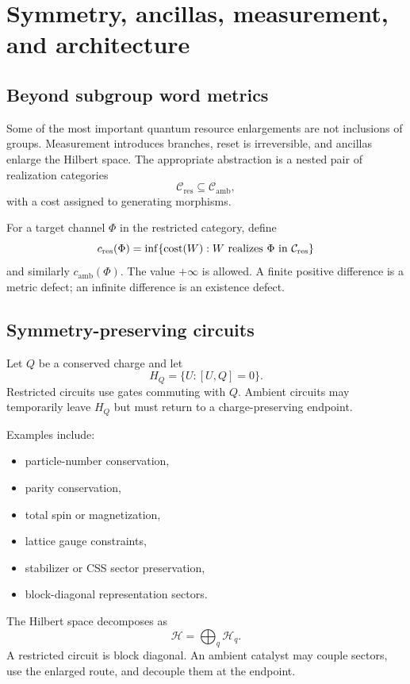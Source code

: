 \section{Symmetry, ancillas, measurement, and architecture}\label{g:ch:symmetry-measurement}


\subsection{Beyond subgroup word metrics}
Some of the most important quantum resource enlargements are not inclusions of groups.  Measurement introduces branches, reset is irreversible, and ancillas enlarge the Hilbert space.  The appropriate abstraction is a nested pair of realization categories
\[
\mathcal C_{\mathrm{res}}
\subseteq
\mathcal C_{\mathrm{amb}},
\]
with a cost assigned to generating morphisms.

For a target channel $\Phi$ in the restricted category, define
\[
c_{\mathrm{res}}(\Phi)
=
\inf\{\operatorname{cost}(W):W\text{ realizes }\Phi\text{ in }\mathcal C_{\mathrm{res}}\}
\]
and similarly $c_{\mathrm{amb}}(\Phi)$.  The value $+\infty$ is allowed.  A finite positive difference is a metric defect; an infinite difference is an existence defect.

\subsection{Symmetry-preserving circuits}
Let $Q$ be a conserved charge and let
\[
H_Q=\{U:[U,Q]=0\}.
\]
Restricted circuits use gates commuting with $Q$.  Ambient circuits may temporarily leave $H_Q$ but must return to a charge-preserving endpoint.

Examples include:
\begin{itemize}
\item particle-number conservation,
\item parity conservation,
\item total spin or magnetization,
\item lattice gauge constraints,
\item stabilizer or CSS sector preservation,
\item block-diagonal representation sectors.
\end{itemize}

The Hilbert space decomposes as
\[
\mathcal H=\bigoplus_q\mathcal H_q.
\]
A restricted circuit is block diagonal.  An ambient catalyst may couple sectors, use the enlarged route, and decouple them at the endpoint.

